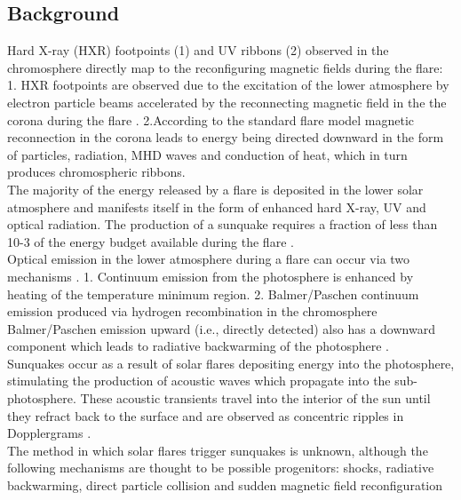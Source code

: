 \subsection{Background}
Hard X-ray (HXR) footpoints (1) and UV ribbons (2) observed in the chromosphere directly map to the reconfiguring magnetic fields during the flare: 
1. HXR footpoints are observed due to the excitation of the lower atmosphere by electron particle beams accelerated by the reconnecting magnetic field in the the corona during the flare \citep{1995ApJ...455..347A}.
2.According to the standard flare model \citep{1964NASSP..50..451C, 1966Natur.211..695S, 1974SoPh...34..323H, 1976SoPh...50...85K} magnetic reconnection in the corona leads to energy being directed downward in the form of particles, radiation, MHD waves and conduction of heat, which in turn produces chromospheric ribbons.\\

The majority of the energy released by a flare is deposited in the lower solar atmosphere and manifests itself in the form of enhanced hard X-ray, UV and optical radiation. The production of a sunquake requires a fraction of less than 10-3 of the energy budget available during the flare \citep{2005ApJ...630.1168D}. \\


Optical emission in the lower atmosphere during a flare can occur via two mechanisms \citep{2007ASPC..368..417D}. 
1. Continuum emission from the photosphere is enhanced by heating of the temperature minimum region.
2. Balmer/Paschen continuum emission produced via hydrogen recombination in the chromosphere \\

Balmer/Paschen emission upward (i.e., directly detected) also has a downward component which leads to radiative backwarming of the photosphere \citep{1989SoPh..124..303M}. \\

Sunquakes occur as a result of solar flares depositing energy into the photosphere, stimulating the production of acoustic waves which propagate into the sub-photosphere. These acoustic transients travel into the interior of the sun until they refract back to the surface and are observed as concentric ripples in Dopplergrams \citep{2014arXiv1402.1249K}. \\

The method in which solar flares trigger sunquakes is unknown, although the following mechanisms are thought to be possible progenitors: shocks, radiative backwarming, direct particle collision and sudden magnetic field reconfiguration 



